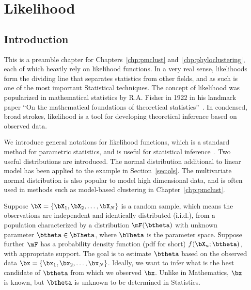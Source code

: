 
\chapter{Likelihood}
\label{chp:likelihood}




\section{Introduction}
\label{sec:likelihood_introduction}

This is a preamble chapter for Chapters~\ref{chp:pmclust}
and~\ref{chp:phyloclustering}, each of which heavily rely on
likelihood functions.  In a very real sense, 
likelihoods form the dividing line that separates statistics from other 
fields, and as such is one of the most important Statistical 
techniques.  The concept of likelihood was popularized
in mathematical statistics by R.A. Fisher in 1922 in his landmark paper
``On the mathematical foundations of theoretical
statistics''~\citep{Fisher1922}.
In condensed, broad strokes, likelihood is a tool for developing theoretical 
inference based on observed data.

We introduce general notations for likelihood functions,
which is a standard method for parametric statistics, and is
useful for statistical inference~\citep{Casella2001}.
Two useful distributions are introduced.
The normal distribution additional to linear model has been applied to
the example in Section~\ref{sec:ols}.
The multivariate normal
distribution
is also popular to model high dimensional data, and is often used in methods 
such as model-based clustering in Chapter~\ref{chp:pmclust}.

Suppose $\bX = \{\bX_1, \bX_2, \ldots, \bX_N\}$ is a random sample,
which means the observations are independent and identically distributed
(i.i.d.),
from a population characterized by a distribution $\mF(\btheta)$ with unknown
parameter $\btheta \in \bTheta$, where $\bTheta$ is the parameter space.
Suppose further $\mF$ has a probability density function
(pdf for short)
$f(\bX_n; \btheta)$, with appropriate support.
The goal is to estimate $\btheta$ based on the observed data
$\bx = \{\bx_1, \bx_2, \ldots, \bx_N\}$.
Ideally, we want to infer what is the best candidate of $\btheta$
from which we observed $\bx$.
Unlike in Mathematics, $\bx$ is known, but $\btheta$ is unknown
to be determined in Statistics.

